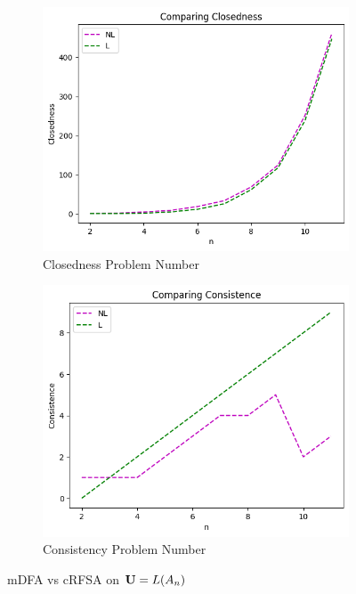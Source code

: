 \begin{figure}[!htb]
\begin{subfigure}[b]{0.25\textwidth}
    \includegraphics[width=\textwidth]{../statistics/plots/wrostRFSA/Closedness.png}
    \caption{Closedness Problem Number}
    \label{fig:ClosednessWrostRFSACompare}
  \end{subfigure}
  \begin{subfigure}[b]{0.25\textwidth}
    \includegraphics[width=\textwidth]{../statistics/plots/wrostRFSA/Consistence.png}
    \caption{Consistency Problem Number}
    \label{fig:ConsistenceWrostRFSACompare}
  \end{subfigure}
  \caption{mDFA vs cRFSA on $\mathbf{U} = L(A_n)$}
  \label{fig:wrostRFSA}
\end{figure}

